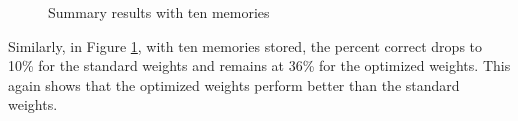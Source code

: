 \begin{figure}[h]
	\centering
	\caption{Summary results with ten memories}
	\label{fg:ost5}
\end{figure}

Similarly, in Figure \ref{fg:ost5}, with ten memories stored, the percent correct drops to 10\% for the standard weights and remains at 36\% for the optimized weights. This again shows that the optimized weights perform better than the standard weights.\\


